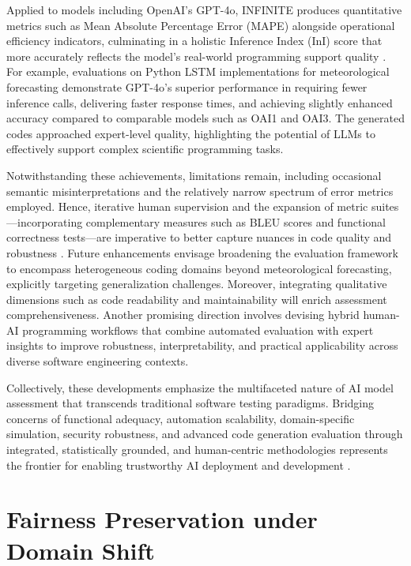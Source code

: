 \documentclass[sigconf]{acmart}
\begin{document}
Applied to models including OpenAI’s GPT-4o, INFINITE produces quantitative metrics such as Mean Absolute Percentage Error (MAPE) alongside operational efficiency indicators, culminating in a holistic Inference Index (InI) score that more accurately reflects the model’s real-world programming support quality \cite{ref9}. For example, evaluations on Python LSTM implementations for meteorological forecasting demonstrate GPT-4o’s superior performance in requiring fewer inference calls, delivering faster response times, and achieving slightly enhanced accuracy compared to comparable models such as OAI1 and OAI3. The generated codes approached expert-level quality, highlighting the potential of LLMs to effectively support complex scientific programming tasks.

Notwithstanding these achievements, limitations remain, including occasional semantic misinterpretations and the relatively narrow spectrum of error metrics employed. Hence, iterative human supervision and the expansion of metric suites—incorporating complementary measures such as BLEU scores and functional correctness tests—are imperative to better capture nuances in code quality and robustness \cite{ref9}. Future enhancements envisage broadening the evaluation framework to encompass heterogeneous coding domains beyond meteorological forecasting, explicitly targeting generalization challenges. Moreover, integrating qualitative dimensions such as code readability and maintainability will enrich assessment comprehensiveness. Another promising direction involves devising hybrid human-AI programming workflows that combine automated evaluation with expert insights to improve robustness, interpretability, and practical applicability across diverse software engineering contexts.

Collectively, these developments emphasize the multifaceted nature of AI model assessment that transcends traditional software testing paradigms. Bridging concerns of functional adequacy, automation scalability, domain-specific simulation, security robustness, and advanced code generation evaluation through integrated, statistically grounded, and human-centric methodologies represents the frontier for enabling trustworthy AI deployment and development \cite{ref1,ref2,ref3,ref9,ref27,ref29,ref30,ref31,ref32}.

\section{Fairness Preservation under Domain Shift}
\end{document}
